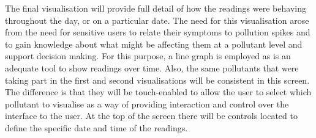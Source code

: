 The final visualisation will provide full detail of how the readings were behaving throughout the day, or on a particular date. The need for this visualisation arose from the need for sensitive users to relate their symptoms to pollution spikes and to gain knowledge about what might be affecting them at a pollutant level and support decision making. For this purpose, a line graph is employed as is an adequate tool to show readings over time. Also, the same pollutants that were taking part in the first and second visualisations will be consistent in this screen. The difference is that they will be touch-enabled to allow the user to select which pollutant to visualise as a way of providing interaction and control over the interface to the user. At the top of the screen there will be controls located to define the specific date and time of the readings.
